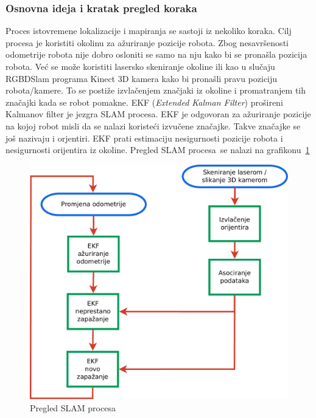 \subsubsection{Osnovna ideja i kratak pregled koraka} %
\label{ssub:Osnovna ideja }
Proces istovremene lokalizacije i mapiranja se sastoji iz nekoliko
koraka. Cilj procesa je koristiti okolinu za ažuriranje pozicije robota.
Zbog nesavršenosti odometrije robota nije dobro osloniti se samo na nju
kako bi se pronašla pozicija robota. Već se može koristiti lasersko
skeniranje okoline ili kao u slučaju RGBDSlam programa Kinect 3D kamera
kako bi pronašli pravu poziciju robota/kamere. To se postiže
izvlačenjem značjaki iz okoline i promatranjem tih značajki kada se
robot pomakne. EKF (\textit{Extended Kalman Filter}) prošireni Kalmanov
filter je jezgra SLAM procesa. EKF je odgovoran za ažuriranje pozicije
na kojoj robot misli da se nalazi koristeći izvučene značajke. Takve
značajke se još nazivaju i orjentiri. EKF prati estimaciju nesigurnosti
pozicije robota i nesigurnosti orijentira iz okoline. Pregled SLAM
procesa~\footnotemark[1] se nalazi na grafikonu~\ref{fig:slam-overview.pdf}  

\begin{figure}[h]
\renewcommand{\figurename}{Grafikon}
\centering
\includegraphics[scale=0.43]{figures/slam-overview.pdf}
\caption{Pregled SLAM procesa}
\label{fig:slam-overview.pdf}
\end{figure}

